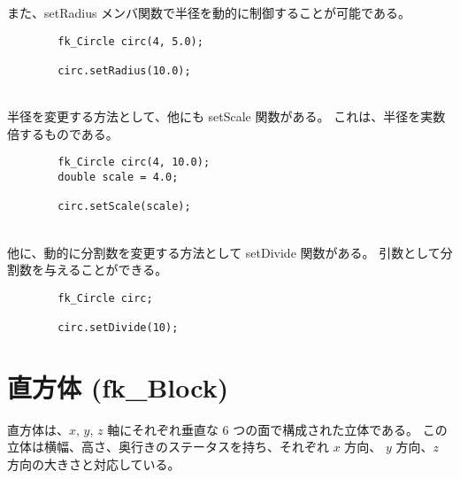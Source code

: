 また、setRadius メンバ関数で半径を動的に制御することが可能である。
\\
\begin{screen}
\begin{verbatim}
        fk_Circle circ(4, 5.0);

        circ.setRadius(10.0);
\end{verbatim}
\end{screen}
~ \\
半径を変更する方法として、他にも setScale 関数がある。
これは、半径を実数倍するものである。
\\
\begin{breakbox}
\begin{verbatim}
        fk_Circle circ(4, 10.0);
        double scale = 4.0;

        circ.setScale(scale);
\end{verbatim}
\end{breakbox}
~ \\
他に、動的に分割数を変更する方法として setDivide 関数がある。
引数として分割数を与えることができる。
\\
\begin{breakbox}
\begin{verbatim}
        fk_Circle circ;

        circ.setDivide(10);
\end{verbatim}
\end{breakbox}
\section{直方体 (fk\_Block)}
直方体は、\(x\), \(y\), \(z\) 軸にそれぞれ垂直な
6 つの面で構成された立体である。
この立体は横幅、高さ、奥行きのステータスを持ち、それぞれ \(x\) 方向、
\(y\) 方向、\(z\) 方向の大きさと対応している。

